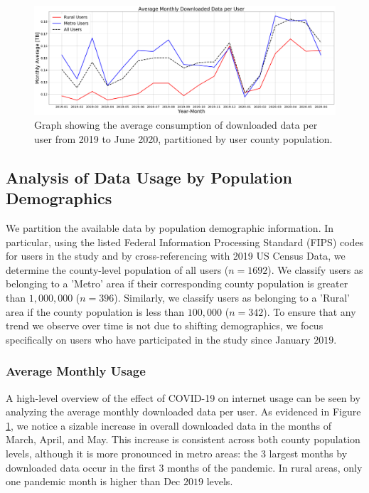 \begin{figure}
\centering
\includegraphics[width=1.0\linewidth]{figs/monthly_downloaded_data.png}
\caption{Graph showing the average consumption of downloaded data per user from 2019 to June 2020, partitioned by user county population.}
\label{fig:downloadmetro_rural}
\end{figure}

\subsection{Analysis of Data Usage by Population Demographics}
We partition the available data by population demographic information. In particular, using the listed Federal Information Processing Standard (FIPS) codes for users in the study and by cross-referencing with 2019 US Census Data, we determine the county-level population of all users ($n=1692$). We classify users as belonging to a 'Metro' area if their corresponding county population is greater than $1,000,000$ ($n=396$). Similarly, we classify users as belonging to a 'Rural' area if the county population is less than $100,000$ ($n=342$). To ensure that any trend we observe over time is not due to shifting demographics, we focus specifically on users who have participated in the study since January $2019$.

\subsubsection{Average Monthly Usage}
A high-level overview of the effect of COVID-19 on internet usage can be seen by analyzing the average monthly downloaded data per user. As evidenced in Figure \ref{fig:downloadmetro_rural}, we notice a sizable increase in overall downloaded data in the months of March, April, and May. This increase is consistent across both county population levels, although it is more pronounced in metro areas: the 3 largest months by downloaded data occur in the first 3 months of the pandemic. In rural areas, only one pandemic month is higher than Dec $2019$ levels.

